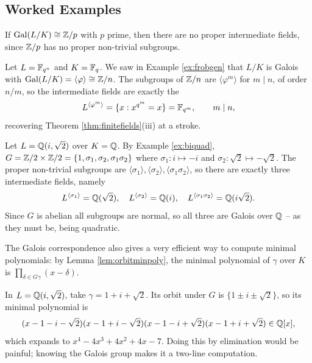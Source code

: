 \documentclass[a4paper]{scrartcl}
\newcommand{\Gal}{\operatorname{Gal}}
\begin{document}
\subsection{Worked Examples}

\begin{example}
	If $\Gal(L/K) \cong \Z/p$ with $p$ prime, then there are no proper intermediate fields, since $\mathbb{Z}/p$ has no proper non-trivial subgroups.
\end{example}

\begin{example}
	Let $L = \mathbb{F}_{q^n}$ and $K = \mathbb{F}_q$. We saw in Example \ref{ex:frobgen} that $L/K$ is Galois with $\Gal(L/K) = \langle\varphi\rangle \cong \Z/n$. The subgroups of $\mathbb{Z}/n$ are $\langle \varphi^m\rangle$ for $m \mid n$, of order $n/m$, so the intermediate fields are exactly the
	$$L^{\langle\varphi^m\rangle} = \{x : x^{q^m} = x\} = \mathbb{F}_{q^m}, \qquad m \mid n,$$
	recovering Theorem \ref{thm:finitefields}(iii) at a stroke.
\end{example}

\begin{example}
	Let $L = \mathbb{Q}(i,\sqrt2)$ over $K = \mathbb{Q}$. By Example \ref{ex:biquad}, $G = \mathbb{Z}/2\times\mathbb{Z}/2 = \{1,\sigma_1,\sigma_2,\sigma_1\sigma_2\}$ where $\sigma_1 : i \mapsto -i$ and $\sigma_2 : \sqrt2 \mapsto -\sqrt2$. The proper non-trivial subgroups are $\langle\sigma_1\rangle, \langle\sigma_2\rangle, \langle\sigma_1\sigma_2\rangle$, so there are exactly three intermediate fields, namely
	$$L^{\langle\sigma_1\rangle} = \mathbb{Q}(\sqrt 2), \quad L^{\langle\sigma_2\rangle} = \mathbb{Q}(i), \quad L^{\langle\sigma_1\sigma_2\rangle} = \mathbb{Q}(i\sqrt 2).$$
	Since $G$ is abelian all subgroups are normal, so all three are Galois over $\mathbb{Q}$ -- as they must be, being quadratic.
\end{example}

The Galois correspondence also gives a very efficient way to compute minimal polynomials: by Lemma \ref{lem:orbitminpoly}, the minimal polynomial of $\gamma$ over $K$ is $\prod_{\delta \in G\gamma}(x - \delta)$.

\begin{example}
	In $L = \mathbb{Q}(i,\sqrt2)$, take $\gamma = 1 + i + \sqrt 2$. Its orbit under $G$ is $\{1 \pm i \pm \sqrt 2\}$, so its minimal polynomial is
	$$(x-1-i-\sqrt2)(x-1+i-\sqrt2)(x-1-i+\sqrt2)(x-1+i+\sqrt2) \in \mathbb{Q}[x],$$
	which expands to $x^4 - 4x^3 + 4x^2 + 4x - 7$. Doing this by elimination would be painful; knowing the Galois group makes it a two-line computation.
\end{example}
\end{document}
